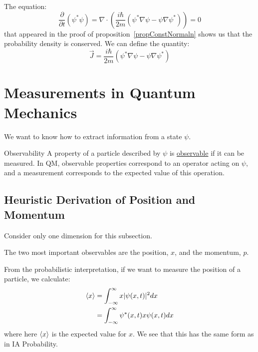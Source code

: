 \documentclass[../Main.tex]{subfiles}
\begin{document}
\begin{remark}
    The equation:
    \begin{equation*}
        \frac{\partial}{\partial t} (\psi^* \psi) = \nabla \cdot \left(\frac{i\hbar}{2m}(\psi^* \nabla \psi - \psi \nabla \psi^*)\right) = 0
    \end{equation*}
    that appeared in the proof of proposition~\ref{propConstNormaln} shows us that the probability density is conserved. We can define the quantity:
    \begin{equation*}
        \vec{J} = \frac{i\hbar}{2m}(\psi^* \nabla \psi - \psi \nabla \psi^*)
    \end{equation*}
\end{remark}
\section{Measurements in Quantum Mechanics}
We want to know how to extract information from a state $\psi$.
\begin{definition}{Observability}
    A property of a particle described by $\psi$ is \underline{observable} if it can be measured. In QM, observable properties correspond to an operator acting on $\psi$, and a measurement corresponds to the expected value of this operation.
\end{definition}
\subsection{Heuristic Derivation of Position and Momentum}
\label{sscHeuristicMesurements}
Consider only one dimension for this subsection.

The two most important observables are the position, $x$, and the momentum, $p$.

From the probabilistic interpretation, if we want to measure the position of a particle, we calculate:
\begin{align*}
    \langle x \rangle &= \int_{-\infty}^{\infty} x |\psi(x, t)|^2 dx \\
    &= \int_{-\infty}^\infty \psi^*(x, t) x \psi(x, t) dx
\end{align*}
where here $\langle x \rangle$ is the expected value for $x$. We see that this has the same form as in IA Probability.
\end{document}
